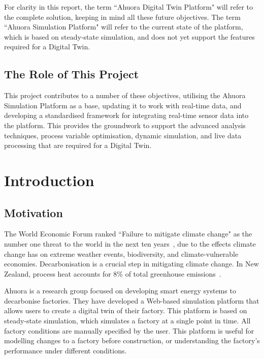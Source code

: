 \documentclass[12pt]{report}
\begin{document}
For clarity in this report, the term ``Ahuora Digital Twin Platform" will refer to the complete solution, keeping in mind all these future objectives. The term ``Ahuora Simulation Platform" will refer to the current state of the platform, which is based on steady-state simulation, and does not yet support the features required for a Digital Twin.

\section{The Role of This Project}

This project contributes to a number of these objectives, utilising the Ahuora Simulation Platform as a base, updating it to work with real-time data, and developing a standardised framework for integrating real-time sensor data into the platform. This provides the groundwork to support the advanced analysis techniques, process variable optimisation, dynamic simulation, and live data processing that are required for a Digital Twin.

\chapter{Introduction}



\section{Motivation}

The World Economic Forum ranked ``Failure to mitigate climate change" as the number one threat to the world in the next ten years~\cite{GlobalRisksReport}, due to the effects climate change has on extreme weather events, biodiversity, and climate-vulnerable economies. Decarbonisation is a crucial step in mitigating climate change. In New Zealand, process heat accounts for 8\% of total greenhouse emissions~\cite{DecarbonisingProcessHeat}.

Ahuora is a research group focused on developing smart energy systems to decarbonise factories. They have developed a Web-based simulation platform that allows users to create a digital twin of their factory.
This platform is based on steady-state simulation, which simulates a factory at a single point in time. All factory conditions are manually specified by the user.
This platform is useful for modelling changes to a factory before construction, or understanding the factory's performance under different conditions.
\end{document}
